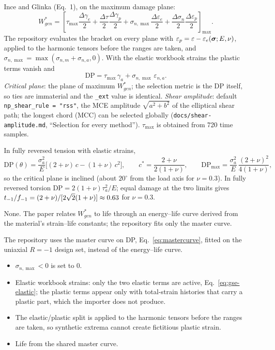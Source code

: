  Ince and Glinka (Eq.~1), on the maximum damage plane:
\begin{equation}
W^*_{gen} = \left[\tau_{\max}\frac{\Delta\gamma_e}{2} + \frac{\Delta\tau}{2}\frac{\Delta\gamma_p}{2}
 + \sigma_{n,\max}\frac{\Delta\varepsilon_e}{2} + \frac{\Delta\sigma_n}{2}\frac{\Delta\varepsilon_p}{2}\right]_{\max} .
\label{eq:gse-main}
\end{equation}
The repository evaluates the bracket on every plane with
$\varepsilon_p=\varepsilon-\varepsilon_e(\boldsymbol\sigma;E,\nu)$, applied to the harmonic tensors before the
ranges are taken, and $\sigma_{n,\max}=\max(\sigma_{n,m}+\sigma_{n,a},0)$. With the elastic
workbook strains the plastic terms vanish and
\begin{equation}
\mathrm{DP} = \tau_{\max}\,\gamma_a + \sigma_{n,\max}\,\varepsilon_{n,a} .
\label{eq:gse-elastic}
\end{equation}
\emph{Critical plane}: the plane of maximum $W^*_{gen}$; the selection metric is the DP itself, so
ties are immaterial and the \texttt{\_ext} value is identical. \emph{Shear amplitude}: default
\texttt{np\_shear\_rule = "rss"}, the MCE amplitude $\sqrt{a^2+b^2}$ of the elliptical shear path;
the longest chord (MCC) can be selected globally (\texttt{docs/shear-amplitude.md}, ``Selection for
every method''). $\tau_{\max}$ is obtained from 720 time samples.

In fully reversed tension with elastic strains,
\begin{equation}
\mathrm{DP}(\theta) = \frac{\sigma_a^2}{E}\bigl[(2+\nu)\,c-(1+\nu)\,c^2\bigr],\qquad
c^* = \frac{2+\nu}{2(1+\nu)},\qquad
\mathrm{DP}_{\max} = \frac{\sigma_a^2}{E}\,\frac{(2+\nu)^2}{4(1+\nu)} ,
\label{eq:gse-tension}
\end{equation}
so the critical plane is inclined (about $20^\circ$ from the load axis for $\nu=0.3$). In fully
reversed torsion $\mathrm{DP}=2(1+\nu)\tau_a^2/E$; equal damage at the two limits gives
$t_{-1}/f_{-1}=(2+\nu)/[2\sqrt2(1+\nu)]\approx0.63$ for $\nu=0.3$.

 None. The paper relates $W^*_{gen}$ to life through an
energy--life curve derived from the material's strain--life constants; the repository fits only
the master curve.

 The repository uses the master curve on DP, Eq.~\eqref{eq:mastercurve}, fitted on the
uniaxial $R=-1$ design set, instead of the energy--life curve.

\begin{itemize}
\item $\sigma_{n,\max}<0$ is set to 0.
\item Elastic workbook strains: only the two elastic terms are active,
  Eq.~\eqref{eq:gse-elastic}; the plastic terms appear only with total-strain histories that carry
  a plastic part, which the importer does not produce.
\item The elastic/plastic split is applied to the harmonic tensors before the ranges are taken, so
  synthetic extrema cannot create fictitious plastic strain.
\item Life from the shared master curve.
\end{itemize}

